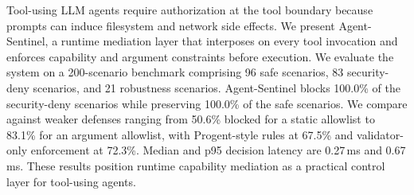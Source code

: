 Tool-using LLM agents require authorization at the tool boundary because prompts can induce filesystem and network side effects. We present Agent-Sentinel, a runtime mediation layer that interposes on every tool invocation and enforces capability and argument constraints before execution. We evaluate the system on a 200-scenario benchmark comprising 96 safe scenarios, 83 security-deny scenarios, and 21 robustness scenarios. Agent-Sentinel blocks 100.0\% of the security-deny scenarios while preserving 100.0\% of the safe scenarios. We compare against weaker defenses ranging from 50.6\% blocked for a static allowlist to 83.1\% for an argument allowlist, with Progent-style rules at 67.5\% and validator-only enforcement at 72.3\%. Median and p95 decision latency are 0.27\,ms and 0.67\,ms. These results position runtime capability mediation as a practical control layer for tool-using agents.
